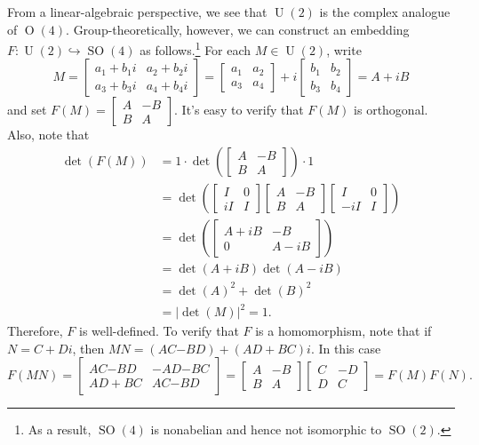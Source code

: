 \documentclass[10pt,letterpaper,cm]{nupset}
\theoremstyle{definition}
\theoremstyle{theorem}
\theoremstyle{remark}
\newcommand{\1}{\mathbf{1}}
\newcommand{\0}{\vec {0}}
\DeclareMathOperator{\ORT}{O}
\DeclareMathOperator{\SO}{SO}
\DeclareMathOperator{\U}{U}
\begin{document}
From a linear-algebraic perspective, we see that $\U(2)$ is the complex analogue of $\ORT(4)$. Group-theoretically, however, we can construct an embedding $F: \U(2) \hookrightarrow \SO(4)$ as follows.\footnote{As a result, $\SO(4)$ is nonabelian and hence not isomorphic to $\SO(2).$} For each $M\in \U(2)$, write $$M=\begin{bmatrix} a_1+b_1i & a_2+b_2i \\ a_3+b_3i & a_4+b_4i \end{bmatrix}=\begin{bmatrix} a_1 & a_2 \\ a_3 & a_4 \end{bmatrix} +i \begin{bmatrix} b_1 & b_2 \\ b_3 & b_4\end{bmatrix}=A+iB$$ and set $F(M)=\begin{bmatrix} A & {-B} \\ B & A\end{bmatrix}$. It's easy to verify that $F(M)$ is orthogonal.
Also, note that 
\begin{align*}
\det(F(M))& =1\cdot \det \left(\begin{bmatrix} A & {-B} \\ B & A\end{bmatrix} \right)\cdot 1
\\ & = \det \left(\begin{bmatrix} I & 0 \\ iI & I\end{bmatrix}\begin{bmatrix} A & {-B} \\ B & A\end{bmatrix}\begin{bmatrix} I & 0 \\ -iI & I\end{bmatrix} \right)
\\ & =\det \left(\begin{bmatrix} A +iB& {-B} \\ 0 & A-iB \end{bmatrix} \right)
\\ & =\det(A+iB)\det(A-iB)
\\ &= \det(A)^2 + \det(B)^2
\\ & =\left\lvert{\det(M)}\right\rvert^2=1
.
\end{align*} Therefore, $F$ is well-defined. 
To verify that $F$ is a homomorphism, note that if $N=C+Di$, then \linebreak $MN=(AC{-B}D)+(AD+BC)i$. In this case $$F(MN)= \begin{bmatrix} A C{-BD} & {-A}D{-BC} \\ AD+BC & AC{-B}D\end{bmatrix}=\begin{bmatrix} A & {-B} \\ B & A\end{bmatrix}\begin{bmatrix} C & -D \\ D & C\end{bmatrix}=F(M)F(N).$$
\end{document}
